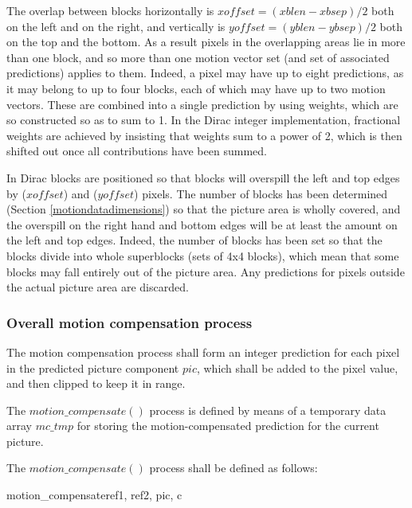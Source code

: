 \begin{informative*}
The overlap between blocks horizontally is $xoffset=(xblen - xbsep)/2$ both on the left
and on the right, and vertically is $yoffset=(yblen - ybsep)/2$ both on the top and the
bottom. As a result pixels in the overlapping areas lie in more than
one block, and so more than one motion vector set (and set of associated predictions)
applies to them. Indeed, a pixel may have up to eight predictions, as it may belong to
up to four blocks, each of which may have up to two motion vectors. These are combined
into a single prediction by using weights, which are so constructed so as to sum to 1. In
 the  Dirac integer implementation, fractional weights are achieved by insisting that weights
 sum to a power of 2, which is then shifted out once all contributions have been summed.

In Dirac blocks are positioned so that blocks will overspill the left and top edges by 
($xoffset$) and ($yoffset$) pixels.  The number of blocks has been
determined (Section \ref{motiondatadimensions}) so that the picture area is wholly
 covered, and the overspill
 on the right hand and bottom edges will be at least the amount on the left and top edges. 
Indeed, the number of blocks has been set so that the blocks divide into whole superblocks
(sets of 4x4 blocks), which mean that some blocks may fall entirely out of the picture area. 
 Any predictions for pixels outside the actual picture area are discarded.
\end{informative*}

\subsubsection{Overall motion compensation process}
\label{mcprocess}

The motion compensation process shall form an integer prediction for each pixel in 
the predicted picture component $pic$, which shall be added to the pixel value, and
 then clipped to keep it in range.

The $motion\_compensate()$ process is defined by means of a temporary data
array $mc\_tmp$ for storing the motion-compensated prediction for the 
current picture. 

The $motion\_compensate()$ process shall be defined as follows:

\begin{pseudo}{motion\_compensate}{ref1, ref2,  pic, c}
\bsELSE
\bsEND
{}
    \bsEND
\bsEND
{}
    \bsEND
\bsEND
\end{pseudo}

